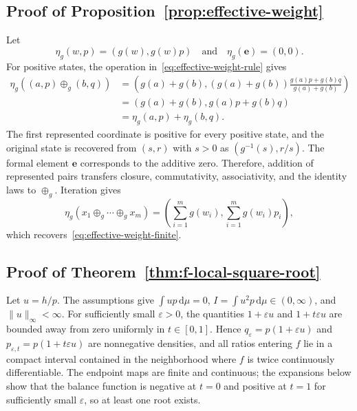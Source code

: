 \documentclass[runningheads]{llncs}
\newcommand{\e}{\mathbf{e}}
\newcommand{\dd}{\,\mathrm{d}}
\newcommand{\norm}[1]{\lVert #1\rVert}
\begin{document}
\subsection*{Proof of Proposition~\ref{prop:effective-weight}}

Let
\begin{equation*}
  \eta_g(w,p)=(g(w),g(w)p)
  \quad\text{and}\quad
  \eta_g(\e)=(0,0).
\end{equation*}
For positive states, the operation in~\eqref{eq:effective-weight-rule} gives
\begin{align*}
  \eta_g((a,p)\oplus_g(b,q))
  &=\left(g(a)+g(b), (g(a)+g(b))\frac{g(a)p+g(b)q}{g(a)+g(b)}\right)\\
  &=(g(a)+g(b),g(a)p+g(b)q)\\
  &=\eta_g(a,p)+\eta_g(b,q).
\end{align*}
The first represented coordinate is positive for every positive state, and the original state is recovered from $(s,r)$ with $s>0$ as $(g^{-1}(s),r/s)$. The formal element $\e$ corresponds to the additive zero. Therefore, addition of represented pairs transfers closure, commutativity, associativity, and the identity laws to $\oplus_g$. Iteration gives
\begin{equation*}
  \eta_g(x_1\oplus_g\cdots\oplus_g x_m)
  =\left(\sum_{i=1}^m g(w_i),\sum_{i=1}^m g(w_i)p_i\right),
\end{equation*}
which recovers~\eqref{eq:effective-weight-finite}.

\subsection*{Proof of Theorem~\ref{thm:f-local-square-root}}

Let $u=h/p$. The assumptions give $\int u p\dd\mu=0$, $I=\int u^2p\dd\mu\in(0,\infty)$, and $\norm{u}_{\infty}<\infty$. For sufficiently small $\varepsilon>0$, the quantities $1+\varepsilon u$ and $1+t\varepsilon u$ are bounded away from zero uniformly in $t\in[0,1]$. Hence $q_\varepsilon=p(1+\varepsilon u)$ and $p_{\varepsilon,t}=p(1+t\varepsilon u)$ are nonnegative densities, and all ratios entering $f$ lie in a compact interval contained in the neighborhood where $f$ is twice continuously differentiable. The endpoint maps are finite and continuous; the expansions below show that the balance function is negative at $t=0$ and positive at $t=1$ for sufficiently small $\varepsilon$, so at least one root exists.
\end{document}
